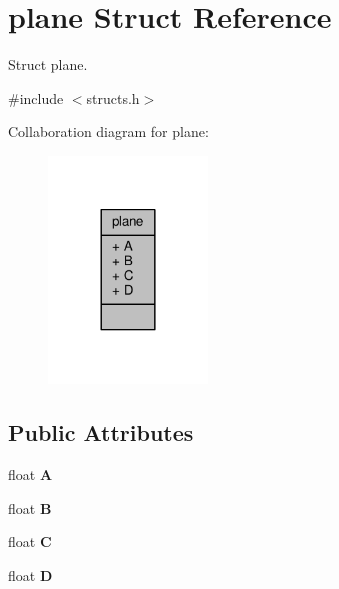 \hypertarget{structplane}{}\section{plane Struct Reference}
\label{structplane}


Struct plane.  




{\ttfamily \#include $<$structs.\+h$>$}



Collaboration diagram for plane\+:\nopagebreak
\begin{figure}[H]
\begin{center}
\leavevmode
\includegraphics[width=120pt]{structplane__coll__graph}
\end{center}
\end{figure}
\subsection*{Public Attributes}
\begin{DoxyCompactItemize}
\item 
float {\bfseries A}\hypertarget{structplane_a7cbe59df743ed3cf5b914b94e5d8ae52}{}\label{structplane_a7cbe59df743ed3cf5b914b94e5d8ae52}

\item 
float {\bfseries B}\hypertarget{structplane_a03abeea8dacf60d86309aa336269906f}{}\label{structplane_a03abeea8dacf60d86309aa336269906f}

\item 
float {\bfseries C}\hypertarget{structplane_a88b564304a3acb0f68186e2ea71a0cdc}{}\label{structplane_a88b564304a3acb0f68186e2ea71a0cdc}

\item 
float {\bfseries D}\hypertarget{structplane_a3c9cd28e6ff7feccc4deee7678d9f8f9}{}\label{structplane_a3c9cd28e6ff7feccc4deee7678d9f8f9}

\end{DoxyCompactItemize}


